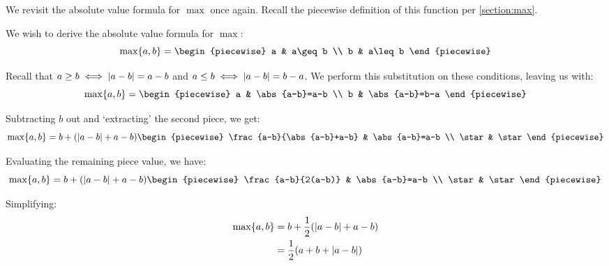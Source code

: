 \begin{example}
    We revisit the absolute value formula for $\max$ once again. Recall the piecewise definition of this function per \ref{section:max}.

    We wish to derive the absolute value formula for $\max$:
    $$
        \max\br{a,b}=\begin{piecewise}
            a & a\geq b \\
            b & a\leq b
        \end{piecewise}
    $$

    Recall that $a\geq b\iff \abs{a-b}=a-b$ and $a\leq b\iff \abs{a-b}=b-a$. We perform this substitution on these conditions, leaving us with:
    $$
        \max\br{a,b}=\begin{piecewise}
            a & \abs{a-b}=a-b \\
            b & \abs{a-b}=b-a
        \end{piecewise}
    $$

    Subtracting $b$ out and `extracting' the second piece, we get:
    $$
        \max\br{a,b}=b+\paren*{\abs{a-b}+a-b}\begin{piecewise}
            \frac{a-b}{\abs{a-b}+a-b} & \abs{a-b}=a-b \\
            \star & \star
        \end{piecewise}
    $$

    Evaluating the remaining piece value, we have:
    $$
        \max\br{a,b}=b+\paren*{\abs{a-b}+a-b}\begin{piecewise}
            \frac{a-b}{2(a-b)} & \abs{a-b}=a-b \\
            \star & \star
        \end{piecewise}
    $$

    Simplifying:
    \begin{align*}
        \max\br{a,b} &= b+\frac{1}{2}\paren*{\abs{a-b}+a-b} \\
        &= \frac{1}{2}\paren*{a+b+\abs{a-b}}
    \end{align*}
\end{example}

